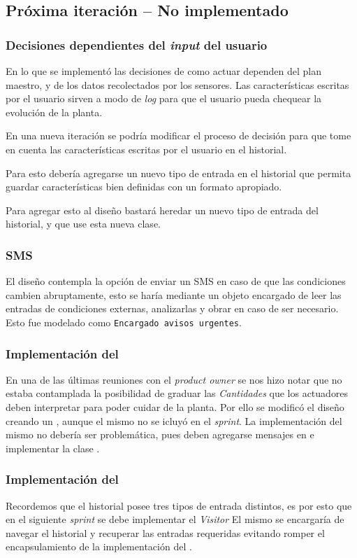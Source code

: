     \subsection{Pr\'oxima iteraci\'on -- No implementado}
      \subsubsection{Decisiones dependientes del \textit{input} del usuario}
        En lo que se implement\'o las decisiones de como actuar dependen del plan
        maestro, y de los datos recolectados por los sensores.
        Las caracter\'isticas escritas por el usuario sirven a modo de \textit{log}
        para que el usuario pueda chequear la evoluci\'on de la planta.

        En una nueva iteraci\'on se podr\'ia modificar el proceso de decisi\'on para
        que tome en cuenta las caracter\'isticas escritas por el usuario en el
        historial.

        Para esto deber\'ia agregarse un nuevo tipo de entrada en el historial
        que permita guardar caracter\'isticas bien definidas con un formato apropiado.

        Para agregar esto al dise\~no bastar\'a heredar un nuevo tipo de entrada
        del historial, y que \decisiones{} use esta nueva clase.

      \subsubsection{SMS}
        El dise\~no contempla la opci\'on de enviar un \textsc{SMS} en caso de que las
        condiciones cambien abruptamente, esto se har\'ia mediante un objeto encargado
        de leer las entradas de condiciones externas, analizarlas y obrar en caso de
        ser necesario. Esto fue modelado como \texttt{Encargado avisos urgentes}.

      \subsubsection{Implementaci\'on del \calibrador{}}
        En una de las \'ultimas reuniones con el \textit{product owner} se nos hizo notar que
        no estaba contamplada la posibilidad de graduar las \textit{Cantidades} que los 
        actuadores deben interpretar para poder cuidar de la planta. Por ello se 
        modific\'o el dise\~no creando un \calibrador{}, aunque el mismo no se 
        icluy\'o en el \textit{sprint}. La implementaci\'on del mismo no deber\'ia ser
        problem\'atica, pues deben agregarse mensajes en \servidor{} e implementar
        la clase \calibrador{}.
        
      \subsubsection{Implementaci\'on del \recopilador{}}
        Recordemos que el historial posee tres tipos de entrada distintos, es por
        esto que en el siguiente \textit{sprint} se debe implementar el \textit{Visitor} \recopilador{}
        El mismo se encargar\'ia de navegar el historial y recuperar las entradas
        requeridas evitando romper el encapsulamiento de la implementaci\'on del \historial{}.
